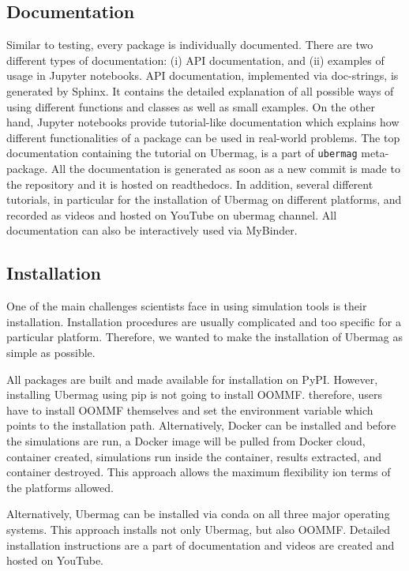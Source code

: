 \documentclass{deliverablereport}
\begin{document}
\subsection{Documentation}

Similar to testing, every package is individually documented. There are two different types of documentation: (i) API documentation, and (ii) examples of usage in Jupyter notebooks. API documentation, implemented via doc-strings, is generated by Sphinx. It contains the detailed explanation of all possible ways of using different functions and classes as well as small examples. On the other hand, Jupyter notebooks provide tutorial-like documentation which explains how different functionalities of a package can be used in real-world problems. The top documentation containing the tutorial on Ubermag, is a part of \texttt{ubermag} meta-package. All the documentation is generated as soon as a new commit is made to the repository and it is hosted on readthedocs. In addition, several different tutorials, in particular for the installation of Ubermag on different platforms, and recorded as videos and hosted on YouTube on ubermag channel. All documentation can also be interactively used via MyBinder.

\subsection{Installation}

One of the main challenges scientists face in using simulation tools is their installation. Installation procedures are usually complicated and too specific for a particular platform. Therefore, we wanted to make the installation of Ubermag as simple as possible.

All packages are built and made available for installation on PyPI. However, installing Ubermag using pip is not going to install OOMMF. therefore, users have to install OOMMF themselves and set the environment variable which points to the installation path. Alternatively, Docker can be installed and before the simulations are run, a Docker image will be pulled from Docker cloud, container created, simulations run inside the container, results extracted, and container destroyed. This approach allows the maximum flexibility ion terms of the platforms allowed.

Alternatively, Ubermag can be installed via conda on all three major operating systems. This approach installs not only Ubermag, but also OOMMF. Detailed installation instructions are a part of documentation and videos are created and hosted on YouTube.
\end{document}
